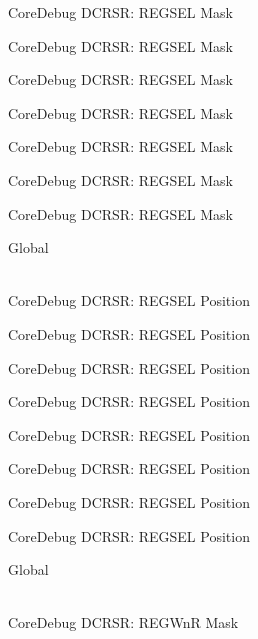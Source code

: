 \begin{DoxyRefList}
\label{deprecated__deprecated000132}%
%
Core\+Debug DCRSR\+: REGSEL Mask 

\label{deprecated__deprecated000188}%
%
Core\+Debug DCRSR\+: REGSEL Mask 

\label{deprecated__deprecated000271}%
%
Core\+Debug DCRSR\+: REGSEL Mask 

\label{deprecated__deprecated000330}%
%
Core\+Debug DCRSR\+: REGSEL Mask 

\label{deprecated__deprecated000406}%
%
Core\+Debug DCRSR\+: REGSEL Mask 

\label{deprecated__deprecated000495}%
%
Core\+Debug DCRSR\+: REGSEL Mask 

\label{deprecated__deprecated000597}%
%
Core\+Debug DCRSR\+: REGSEL Mask  
\item[{\parbox[t]{\linewidth}{Global \doxylink{group___c_m_s_i_s___core_debug_ga52182c8a9f63a52470244c0bc2064f7b}{Core\+Debug\+\_\+\+DCRSR\+\_\+\+REGSEL\+\_\+\+Pos} }}]\hfill \\
\label{deprecated__deprecated000043}%
%
Core\+Debug DCRSR\+: REGSEL Position 

\label{deprecated__deprecated000131}%
%
Core\+Debug DCRSR\+: REGSEL Position 

\label{deprecated__deprecated000187}%
%
Core\+Debug DCRSR\+: REGSEL Position 

\label{deprecated__deprecated000270}%
%
Core\+Debug DCRSR\+: REGSEL Position 

\label{deprecated__deprecated000329}%
%
Core\+Debug DCRSR\+: REGSEL Position 

\label{deprecated__deprecated000405}%
%
Core\+Debug DCRSR\+: REGSEL Position 

\label{deprecated__deprecated000494}%
%
Core\+Debug DCRSR\+: REGSEL Position 

\label{deprecated__deprecated000596}%
%
Core\+Debug DCRSR\+: REGSEL Position  
\item[{\parbox[t]{\linewidth}{Global \doxylink{group___c_m_s_i_s___core_debug_ga1eef4992d8f84bc6c0dffed1c87f90a5}{Core\+Debug\+\_\+\+DCRSR\+\_\+\+REGWn\+R\+\_\+\+Msk} }}]\hfill \\
\label{deprecated__deprecated000042}%
%
Core\+Debug DCRSR\+: REGWnR Mask 


\end{DoxyRefList}

